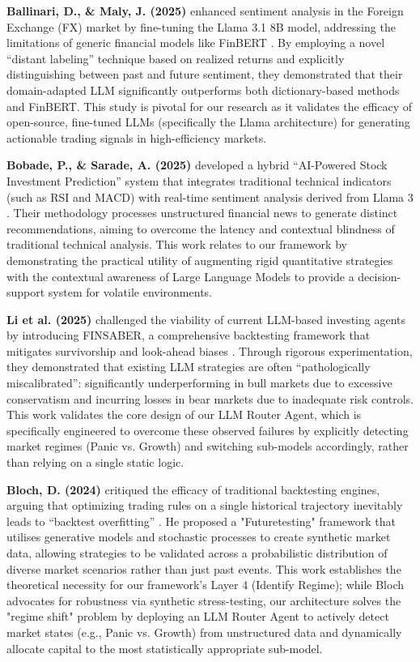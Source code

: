\documentclass[12pt, a4paper]{report}
\begin{document}
\textbf{Ballinari, D., \& Maly, J. (2025)} enhanced sentiment analysis in the Foreign Exchange (FX) market by fine-tuning the Llama 3.1 8B model, addressing the limitations of generic financial models like FinBERT \cite{ballinari2025}. By employing a novel ``distant labeling'' technique based on realized returns and explicitly distinguishing between past and future sentiment, they demonstrated that their domain-adapted LLM significantly outperforms both dictionary-based methods and FinBERT. This study is pivotal for our research as it validates the efficacy of open-source, fine-tuned LLMs (specifically the Llama architecture) for generating actionable trading signals in high-efficiency markets.

\textbf{Bobade, P., \& Sarade, A. (2025)} developed a hybrid ``AI-Powered Stock Investment Prediction'' system that integrates traditional technical indicators (such as RSI and MACD) with real-time sentiment analysis derived from Llama 3 \cite{bobade2025}. Their methodology processes unstructured financial news to generate distinct recommendations, aiming to overcome the latency and contextual blindness of traditional technical analysis. This work relates to our framework by demonstrating the practical utility of augmenting rigid quantitative strategies with the contextual awareness of Large Language Models to provide a decision-support system for volatile environments.

\textbf{Li et al. (2025)} challenged the viability of current LLM-based investing agents by introducing FINSABER, a comprehensive backtesting framework that mitigates survivorship and look-ahead biases \cite{li2025}. Through rigorous experimentation, they demonstrated that existing LLM strategies are often ``pathologically miscalibrated'': significantly underperforming in bull markets due to excessive conservatism and incurring losses in bear markets due to inadequate risk controls. This work validates the core design of our LLM Router Agent, which is specifically engineered to overcome these observed failures by explicitly detecting market regimes (Panic vs. Growth) and switching sub-models accordingly, rather than relying on a single static logic.

\textbf{Bloch, D. (2024)} critiqued the efficacy of traditional backtesting engines, arguing that optimizing trading rules on a single historical trajectory inevitably leads to ``backtest overfitting'' \cite{bloch2024}. He proposed a "Futuretesting" framework that utilises generative models and stochastic processes to create synthetic market data, allowing strategies to be validated across a probabilistic distribution of diverse market scenarios rather than just past events. This work establishes the theoretical necessity for our framework's Layer 4 (Identify Regime); while Bloch advocates for robustness via synthetic stress-testing, our architecture solves the "regime shift" problem by deploying an LLM Router Agent to actively detect market states (e.g., Panic vs. Growth) from unstructured data and dynamically allocate capital to the most statistically appropriate sub-model.
\end{document}
